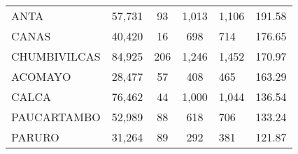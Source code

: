 \begin{tabular}{lrcclr}
	\cellcolor[HTML]{FFFF99}ANTA                                   & 57,731                                                         & 93                                                         & 1,013                & 1,106                                                               & 191.58                                                                       \\
	\cellcolor[HTML]{FFFF99}CANAS                                  & 40,420                                                         & 16                                                         & 698                  & 714                                                                 & 176.65                                                                       \\
	\cellcolor[HTML]{C6E0B4}CHUMBIVILCAS                           & 84,925                                                         & 206                                                        & 1,246                & 1,452                                                               & 170.97                                                                       \\
	\cellcolor[HTML]{C6E0B4}ACOMAYO                                & 28,477                                                         & 57                                                         & 408                  & 465                                                                 & 163.29                                                                       \\
	\cellcolor[HTML]{C6E0B4}CALCA                                  & 76,462                                                         & 44                                                         & 1,000                & 1,044                                                               & 136.54                                                                       \\
	\cellcolor[HTML]{C6E0B4}PAUCARTAMBO                            & 52,989                                                         & 88                                                         & 618                  & 706                                                                 & 133.24                                                                       \\
	\cellcolor[HTML]{C6E0B4}PARURO                                 & 31,264                                                         & 89                                                         & 292                  & 381                                                                 & 121.87                                                                       \\

\end{tabular}
